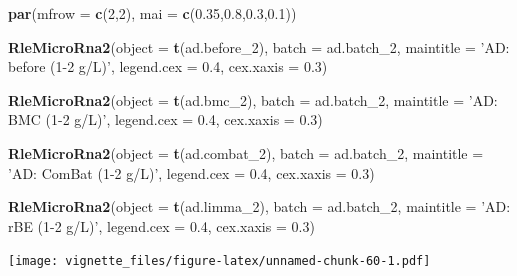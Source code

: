 \documentclass[]{book}
\newenvironment{Shaded}{\begin{snugshade}}{\end{snugshade}}
\newcommand{\KeywordTok}[1]{\textcolor[rgb]{0.13,0.29,0.53}{\textbf{#1}}}
\newcommand{\DataTypeTok}[1]{\textcolor[rgb]{0.13,0.29,0.53}{#1}}
\newcommand{\DecValTok}[1]{\textcolor[rgb]{0.00,0.00,0.81}{#1}}
\newcommand{\FloatTok}[1]{\textcolor[rgb]{0.00,0.00,0.81}{#1}}
\newcommand{\StringTok}[1]{\textcolor[rgb]{0.31,0.60,0.02}{#1}}
\newcommand{\NormalTok}[1]{#1}
\begin{document}
\begin{Shaded}
\begin{Highlighting}[]
\KeywordTok{par}\NormalTok{(}\DataTypeTok{mfrow =} \KeywordTok{c}\NormalTok{(}\DecValTok{2}\NormalTok{,}\DecValTok{2}\NormalTok{), }\DataTypeTok{mai =} \KeywordTok{c}\NormalTok{(}\FloatTok{0.35}\NormalTok{,}\FloatTok{0.8}\NormalTok{,}\FloatTok{0.3}\NormalTok{,}\FloatTok{0.1}\NormalTok{))}

\KeywordTok{RleMicroRna2}\NormalTok{(}\DataTypeTok{object =} \KeywordTok{t}\NormalTok{(ad.before_}\DecValTok{2}\NormalTok{), }\DataTypeTok{batch =}\NormalTok{ ad.batch_}\DecValTok{2}\NormalTok{, }
             \DataTypeTok{maintitle =} \StringTok{'AD: before (1-2 g/L)'}\NormalTok{, }\DataTypeTok{legend.cex =} \FloatTok{0.4}\NormalTok{, }
             \DataTypeTok{cex.xaxis =} \FloatTok{0.3}\NormalTok{)}

\KeywordTok{RleMicroRna2}\NormalTok{(}\DataTypeTok{object =} \KeywordTok{t}\NormalTok{(ad.bmc_}\DecValTok{2}\NormalTok{), }\DataTypeTok{batch =}\NormalTok{ ad.batch_}\DecValTok{2}\NormalTok{, }
             \DataTypeTok{maintitle =} \StringTok{'AD: BMC (1-2 g/L)'}\NormalTok{, }\DataTypeTok{legend.cex =} \FloatTok{0.4}\NormalTok{, }
             \DataTypeTok{cex.xaxis =} \FloatTok{0.3}\NormalTok{)}

\KeywordTok{RleMicroRna2}\NormalTok{(}\DataTypeTok{object =} \KeywordTok{t}\NormalTok{(ad.combat_}\DecValTok{2}\NormalTok{), }\DataTypeTok{batch =}\NormalTok{ ad.batch_}\DecValTok{2}\NormalTok{, }
             \DataTypeTok{maintitle =} \StringTok{'AD: ComBat (1-2 g/L)'}\NormalTok{, }\DataTypeTok{legend.cex =} \FloatTok{0.4}\NormalTok{, }
             \DataTypeTok{cex.xaxis =} \FloatTok{0.3}\NormalTok{)}

\KeywordTok{RleMicroRna2}\NormalTok{(}\DataTypeTok{object =} \KeywordTok{t}\NormalTok{(ad.limma_}\DecValTok{2}\NormalTok{), }\DataTypeTok{batch =}\NormalTok{ ad.batch_}\DecValTok{2}\NormalTok{, }
             \DataTypeTok{maintitle =} \StringTok{'AD: rBE (1-2 g/L)'}\NormalTok{, }\DataTypeTok{legend.cex =} \FloatTok{0.4}\NormalTok{, }
             \DataTypeTok{cex.xaxis =} \FloatTok{0.3}\NormalTok{)}
\end{Highlighting}
\end{Shaded}

\texttt{[image: vignette\_files/figure-latex/unnamed-chunk-60-1.pdf]}
\end{document}

